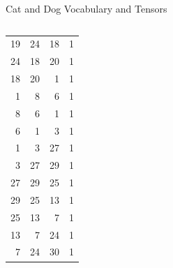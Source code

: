 \documentclass[handout]{beamer}
\begin{document}
\begin{frame}{Cat and Dog Vocabulary and Tensors}
\begin{columns}[T]
\begin{table}
\begin{tabular}{rrr|r}
        19&24&18&1\\
        24&18&20&1\\
        18&20&1&1\\
        1&8&6&1\\
        8&6&1&1\\
        6&1&3&1\\
        1&3&27&1\\
        3&27&29&1\\
        27&29&25&1\\
        29&25&13&1\\
        25&13&7&1\\
        13&7&24&1\\
        7&24&30&1\\
      \end{tabular}
    \end{table}
\end{columns}
\end{frame}
\end{document}
